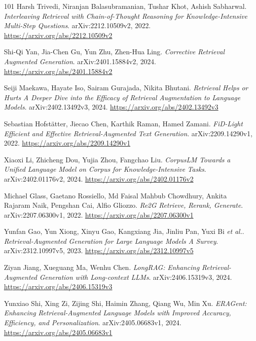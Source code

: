 \documentclass[11pt,a4paper]{article}
\begin{document}
\begin{thebibliography}{101}
Harsh Trivedi, Niranjan Balasubramanian, Tushar Khot, Ashish Sabharwal.
\newblock \emph{Interleaving Retrieval with Chain-of-Thought Reasoning for Knowledge-Intensive Multi-Step Questions}.
\newblock arXiv:2212.10509v2, 2022.
\newblock \url{https://arxiv.org/abs/2212.10509v2}

Shi-Qi Yan, Jia-Chen Gu, Yun Zhu, Zhen-Hua Ling.
\newblock \emph{Corrective Retrieval Augmented Generation}.
\newblock arXiv:2401.15884v2, 2024.
\newblock \url{https://arxiv.org/abs/2401.15884v2}

Seiji Maekawa, Hayate Iso, Sairam Gurajada, Nikita Bhutani.
\newblock \emph{Retrieval Helps or Hurts A Deeper Dive into the Efficacy of Retrieval Augmentation to Language Models}.
\newblock arXiv:2402.13492v3, 2024.
\newblock \url{https://arxiv.org/abs/2402.13492v3}

Sebastian Hofst\"{a}tter, Jiecao Chen, Karthik Raman, Hamed Zamani.
\newblock \emph{FiD-Light Efficient and Effective Retrieval-Augmented Text Generation}.
\newblock arXiv:2209.14290v1, 2022.
\newblock \url{https://arxiv.org/abs/2209.14290v1}

Xiaoxi Li, Zhicheng Dou, Yujia Zhou, Fangchao Liu.
\newblock \emph{CorpusLM Towards a Unified Language Model on Corpus for Knowledge-Intensive Tasks}.
\newblock arXiv:2402.01176v2, 2024.
\newblock \url{https://arxiv.org/abs/2402.01176v2}

Michael Glass, Gaetano Rossiello, Md Faisal Mahbub Chowdhury, Ankita Rajaram Naik, Pengshan Cai, Alfio Gliozzo.
\newblock \emph{Re2G Retrieve, Rerank, Generate}.
\newblock arXiv:2207.06300v1, 2022.
\newblock \url{https://arxiv.org/abs/2207.06300v1}

Yunfan Gao, Yun Xiong, Xinyu Gao, Kangxiang Jia, Jinliu Pan, Yuxi Bi \emph{et al.}.
\newblock \emph{Retrieval-Augmented Generation for Large Language Models A Survey}.
\newblock arXiv:2312.10997v5, 2023.
\newblock \url{https://arxiv.org/abs/2312.10997v5}

Ziyan Jiang, Xueguang Ma, Wenhu Chen.
\newblock \emph{LongRAG: Enhancing Retrieval-Augmented Generation with Long-context LLMs}.
\newblock arXiv:2406.15319v3, 2024.
\newblock \url{https://arxiv.org/abs/2406.15319v3}

Yunxiao Shi, Xing Zi, Zijing Shi, Haimin Zhang, Qiang Wu, Min Xu.
\newblock \emph{ERAGent: Enhancing Retrieval-Augmented Language Models with Improved Accuracy, Efficiency, and Personalization}.
\newblock arXiv:2405.06683v1, 2024.
\newblock \url{https://arxiv.org/abs/2405.06683v1}


\end{thebibliography}
\end{document}
